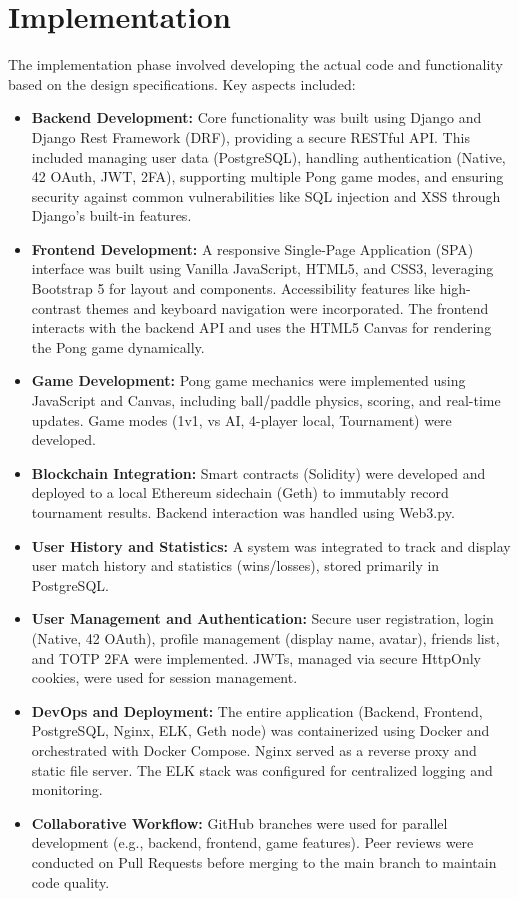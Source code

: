 \section{Implementation}
The implementation phase involved developing the actual code and functionality based on the design specifications. Key aspects included:
\begin{itemize}
    \item \textbf{Backend Development:} Core functionality was built using Django and Django Rest Framework (DRF), providing a secure RESTful API. This included managing user data (PostgreSQL), handling authentication (Native, 42 OAuth, JWT, 2FA), supporting multiple Pong game modes, and ensuring security against common vulnerabilities like SQL injection and XSS through Django's built-in features.
    \item \textbf{Frontend Development:} A responsive Single-Page Application (SPA) interface was built using Vanilla JavaScript, HTML5, and CSS3, leveraging Bootstrap 5 for layout and components. Accessibility features like high-contrast themes and keyboard navigation were incorporated. The frontend interacts with the backend API and uses the HTML5 Canvas for rendering the Pong game dynamically.
    \item \textbf{Game Development:} Pong game mechanics were implemented using JavaScript and Canvas, including ball/paddle physics, scoring, and real-time updates. Game modes (1v1, vs AI, 4-player local, Tournament) were developed.
    \item \textbf{Blockchain Integration:} Smart contracts (Solidity) were developed and deployed to a local Ethereum sidechain (Geth) to immutably record tournament results. Backend interaction was handled using Web3.py.
    \item \textbf{User History and Statistics:} A system was integrated to track and display user match history and statistics (wins/losses), stored primarily in PostgreSQL.
    \item \textbf{User Management and Authentication:} Secure user registration, login (Native, 42 OAuth), profile management (display name, avatar), friends list, and TOTP 2FA were implemented. JWTs, managed via secure HttpOnly cookies, were used for session management.
    \item \textbf{DevOps and Deployment:} The entire application (Backend, Frontend, PostgreSQL, Nginx, ELK, Geth node) was containerized using Docker and orchestrated with Docker Compose. Nginx served as a reverse proxy and static file server. The ELK stack was configured for centralized logging and monitoring.
    \item \textbf{Collaborative Workflow:} GitHub branches were used for parallel development (e.g., backend, frontend, game features). Peer reviews were conducted on Pull Requests before merging to the main branch to maintain code quality.
\end{itemize}

